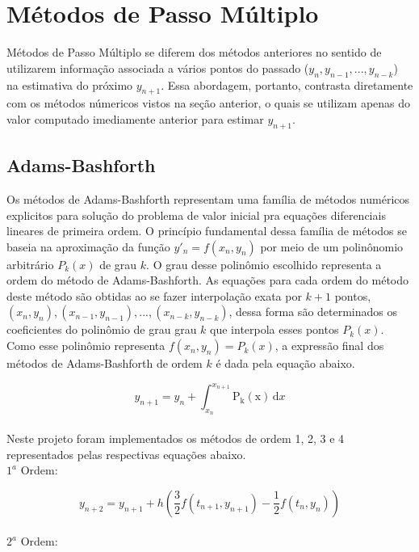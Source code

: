 \documentclass[a4paper]{article}
\begin{document}
\pagebreak

\section{Métodos de Passo Múltiplo}

Métodos de Passo Múltiplo se diferem dos métodos anteriores no sentido de utilizarem informação associada a vários pontos do passado ($y_{n}, y_{n-1},..., y_{n-k}$) na estimativa do próximo $y_{n+1}$. Essa abordagem, portanto, contrasta diretamente com os métodos númericos vistos na seção anterior, o quais se utilizam apenas do valor computado imediamente anterior para estimar $y_{n+1}$. 

\subsection{Adams-Bashforth}

Os métodos de Adams-Bashforth representam uma família de métodos numéricos explicitos para solução do problema de valor inicial pra equações diferenciais lineares de primeira ordem. O princípio fundamental dessa família de métodos se baseia na aproximação da função $y'_{n} = f(x_n,y_n)$ por meio de um polinônomio arbitrário $P_k(x)$ de grau $k$. O grau desse polinômio escolhido representa a ordem do método de Adams-Bashforth. As equações para cada ordem do método deste método são obtidas ao se fazer interpolação exata por $k+1$ pontos, $(x_n,y_n),(x_{n-1},y_{n-1}),...,(x_{n-k},y_{n-k})$, dessa forma são determinados os coeficientes do polinômio de grau grau $k$ que interpola esses pontos $P_k(x)$. Como esse polinômio representa $f(x_n,y_n) = P_k(x)$, a expressão final dos métodos de Adams-Bashforth de ordem $k$ é dada pela equação abaixo.

\begin{equation}
\label{eq:bashforth}
y_{n+1} = y_{n} + \int_{x_{n}}^{x_{n+1}} \mathrm{P_k(x)}\,\mathrm{d}x
\end{equation}
\\
Neste projeto foram implementados os métodos de ordem 1, 2, 3 e 4 representados pelas respectivas equações abaixo.
\vspace{10mm} %
\\
$1^a$ Ordem: 

\begin{equation}
\label{eq:bashforth1}
y_{n+2} = y_{n+1} + h\left( \frac{3}{2}f(t_{n+1}, y_{n+1}) - \frac{1}{2}f(t_n, y_n) \right)
\end{equation}
\\
$2^a$ Ordem: 
\end{document}
